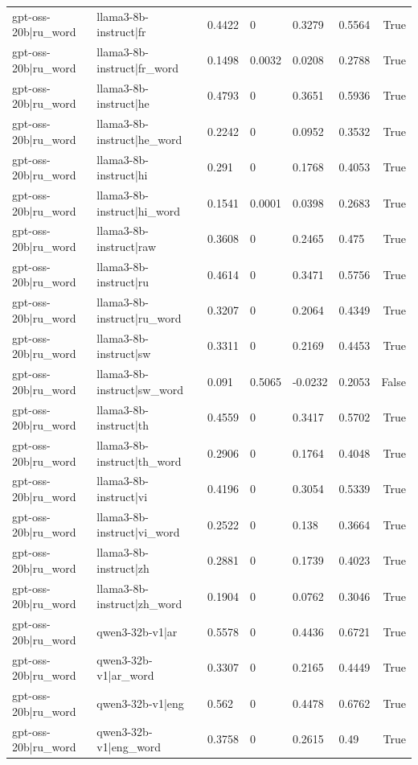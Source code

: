 \begin{table}
\begin{tabular}{llllllr}
gpt-oss-20b|ru_word & llama3-8b-instruct|fr & 0.4422 & 0 & 0.3279 & 0.5564 & True \\
gpt-oss-20b|ru_word & llama3-8b-instruct|fr_word & 0.1498 & 0.0032 & 0.0208 & 0.2788 & True \\
gpt-oss-20b|ru_word & llama3-8b-instruct|he & 0.4793 & 0 & 0.3651 & 0.5936 & True \\
gpt-oss-20b|ru_word & llama3-8b-instruct|he_word & 0.2242 & 0 & 0.0952 & 0.3532 & True \\
gpt-oss-20b|ru_word & llama3-8b-instruct|hi & 0.291 & 0 & 0.1768 & 0.4053 & True \\
gpt-oss-20b|ru_word & llama3-8b-instruct|hi_word & 0.1541 & 0.0001 & 0.0398 & 0.2683 & True \\
gpt-oss-20b|ru_word & llama3-8b-instruct|raw & 0.3608 & 0 & 0.2465 & 0.475 & True \\
gpt-oss-20b|ru_word & llama3-8b-instruct|ru & 0.4614 & 0 & 0.3471 & 0.5756 & True \\
gpt-oss-20b|ru_word & llama3-8b-instruct|ru_word & 0.3207 & 0 & 0.2064 & 0.4349 & True \\
gpt-oss-20b|ru_word & llama3-8b-instruct|sw & 0.3311 & 0 & 0.2169 & 0.4453 & True \\
gpt-oss-20b|ru_word & llama3-8b-instruct|sw_word & 0.091 & 0.5065 & -0.0232 & 0.2053 & False \\
gpt-oss-20b|ru_word & llama3-8b-instruct|th & 0.4559 & 0 & 0.3417 & 0.5702 & True \\
gpt-oss-20b|ru_word & llama3-8b-instruct|th_word & 0.2906 & 0 & 0.1764 & 0.4048 & True \\
gpt-oss-20b|ru_word & llama3-8b-instruct|vi & 0.4196 & 0 & 0.3054 & 0.5339 & True \\
gpt-oss-20b|ru_word & llama3-8b-instruct|vi_word & 0.2522 & 0 & 0.138 & 0.3664 & True \\
gpt-oss-20b|ru_word & llama3-8b-instruct|zh & 0.2881 & 0 & 0.1739 & 0.4023 & True \\
gpt-oss-20b|ru_word & llama3-8b-instruct|zh_word & 0.1904 & 0 & 0.0762 & 0.3046 & True \\
gpt-oss-20b|ru_word & qwen3-32b-v1|ar & 0.5578 & 0 & 0.4436 & 0.6721 & True \\
gpt-oss-20b|ru_word & qwen3-32b-v1|ar_word & 0.3307 & 0 & 0.2165 & 0.4449 & True \\
gpt-oss-20b|ru_word & qwen3-32b-v1|eng & 0.562 & 0 & 0.4478 & 0.6762 & True \\
gpt-oss-20b|ru_word & qwen3-32b-v1|eng_word & 0.3758 & 0 & 0.2615 & 0.49 & True \\

\end{tabular}
\end{table}
